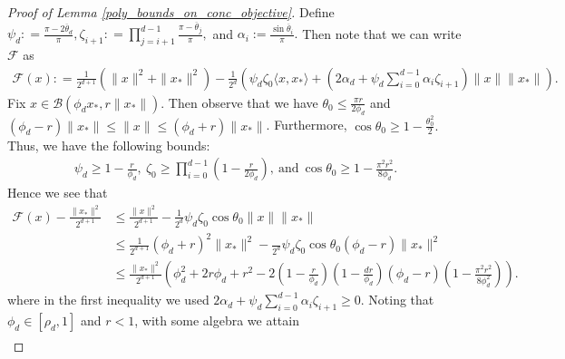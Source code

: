 \documentclass[11pt]{article}
\newcommand{\al}{\alpha}
\theoremstyle{remark}
\begin{document}
\begin{proof}[Proof of Lemma \ref{poly_bounds_on_conc_objective}]
Define 
    $\psi_d : = \frac{\pi - 2\overline{\theta}_d}{\pi}, \zeta_{i+1} : = \prod_{j=i+1}^{d-1}\frac{\pi - \overline{\theta}_{j}}{\pi},$ and $\al_i := \frac{\sin \overline{\theta}_i}{\pi}.$ Then note that we can write $\mathcal{F}$ as  \begin{align}
    \mathcal{F}(x) : = \frac{1}{2^{d+1}}(\|x\|^2 + \|x_*\|^2) - \frac{1}{2^d}\left(\psi_d \zeta_0 \langle x, x_*\rangle + \left(2\al_d + \psi_d\sum_{i=0}^{d-1}\al_i\zeta_{i+1}\right)\|x\|\|x_*\|\right). \nonumber
\end{align}Fix $x \in \mathcal{B}(\phi_d x_*, r\|x_*\|)$. Then observe that we have $\theta_0 \leqslant \frac{\pi r}{2\phi_d}$ and $(\phi_d - r)\|x_*\| \leqslant \|x\| \leqslant (\phi_d + r)\|x_*\|$. Furthermore, $\cos \theta_0 \geqslant 1 - \frac{\theta_0^2}{2}.$ Thus, we have the following bounds: \begin{align*}
    \psi_d \geqslant 1 - \frac{r}{\phi_d},\ \zeta_0 \geqslant \prod_{i=0}^{d-1}\left(1 - \frac{r}{2\phi_d}\right),\ \text{and}\ \cos \theta_0 \geqslant 1 - \frac{\pi^2r^2}{8\phi_d}.
\end{align*} Hence we see that \begin{align*}
    \mathcal{F}(x) - \frac{\|x_*\|^2}{2^{d+1}} & \leqslant \frac{\|x\|^2}{2^{d+1}} - \frac{1}{2^d}\psi_d \zeta_0 \cos \theta_0 \|x\|\|x_*\| \\
    & \leqslant \frac{1}{2^{d+1}}(\phi_d + r)^2\|x_*\|^2 - \frac{}{2^d}\psi_d \zeta_0 \cos \theta_0 (\phi_d -r)\|x_*\|^2 \\
    & \leqslant \frac{\|x_*\|^2}{2^{d+1}}\left(\phi_d^2 + 2r\phi_d + r^2 - 2 \left(1 - \frac{r}{\phi_d}\right)\left(1 - \frac{dr}{\phi_d}\right)(\phi_d - r)\left(1 - \frac{\pi^2r^2}{8\phi_d^2}\right)\right).
\end{align*} %
 where in the first inequality we used $2\al_d + \psi_d\sum_{i=0}^{d-1}\al_i\zeta_{i+1}\geqslant 0.$ Noting that $\phi_d \in [\rho_d,1]$ and $r < 1$, with some algebra we attain \begin{align*}

\end{align*}
\end{proof}
\end{document}
